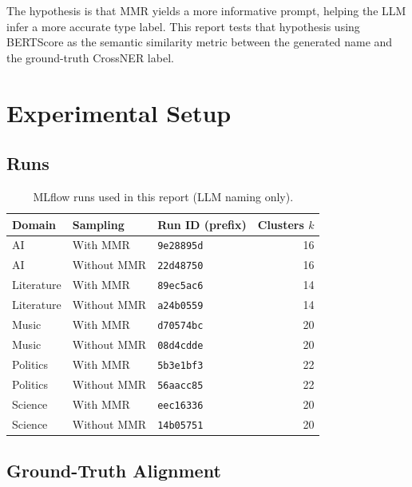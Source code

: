 \documentclass[11pt,a4paper]{article}
\begin{document}
The hypothesis is that MMR yields a more informative prompt, helping the LLM infer a more accurate type label.
This report tests that hypothesis using BERTScore as the semantic similarity metric between the generated name and the ground-truth CrossNER label.

\section{Experimental Setup}

\subsection{Runs}

\begin{table}[h]
\centering
\caption{MLflow runs used in this report (LLM naming only).}
\label{tab:runs}
\small
\setlength{\tabcolsep}{7pt}
\begin{tabular}{lllr}
\toprule
\textbf{Domain} & \textbf{Sampling} & \textbf{Run ID (prefix)} & \textbf{Clusters $k$} \\
\midrule
AI         & \cellcolor{mmrcolor}With MMR    & \texttt{9e28895d} & 16 \\
AI         & \cellcolor{nommrcolor}Without MMR & \texttt{22d48750} & 16 \\
Literature & \cellcolor{mmrcolor}With MMR    & \texttt{89ec5ac6} & 14 \\
Literature & \cellcolor{nommrcolor}Without MMR & \texttt{a24b0559} & 14 \\
Music      & \cellcolor{mmrcolor}With MMR    & \texttt{d70574bc} & 20 \\
Music      & \cellcolor{nommrcolor}Without MMR & \texttt{08d4cdde} & 20 \\
Politics   & \cellcolor{mmrcolor}With MMR    & \texttt{5b3e1bf3} & 22 \\
Politics   & \cellcolor{nommrcolor}Without MMR & \texttt{56aacc85} & 22 \\
Science    & \cellcolor{mmrcolor}With MMR    & \texttt{eec16336} & 20 \\
Science    & \cellcolor{nommrcolor}Without MMR & \texttt{14b05751} & 20 \\
\bottomrule
\end{tabular}
\end{table}

\subsection{Ground-Truth Alignment}
\end{document}

